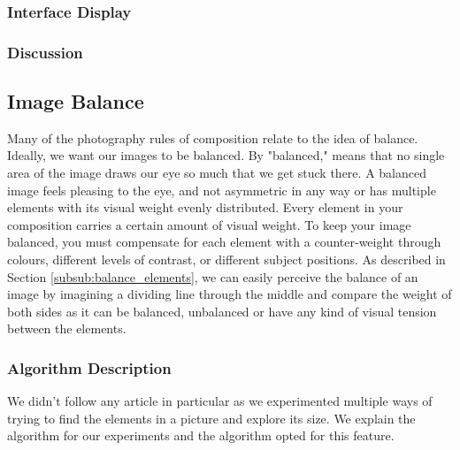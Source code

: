 \subsubsection{Interface Display}


\subsubsection{Discussion}

\subsection{Image Balance}
\label{sub:balance}
Many of the photography rules of composition relate to the idea of balance. Ideally, we want our images to be balanced. By "balanced," means that no single area of the image draws our eye so much that we get stuck there. A balanced image feels pleasing to the eye, and not asymmetric in any way or has multiple elements with its visual weight evenly distributed. Every element in your composition carries a certain amount of visual weight. To keep your image balanced, you must compensate for each element with a counter-weight through colours, different levels of contrast, or different subject positions. As described in Section \ref{subsub:balance_elements}, we can easily perceive the balance of an image by imagining a dividing line through the middle and compare the weight of both sides as it can be balanced, unbalanced or have any kind of visual tension between the elements.

\subsubsection{Algorithm Description}

We didn't follow any article in particular as we experimented multiple ways of trying to find the elements in a picture and explore its size. We explain the algorithm for our experiments and the algorithm opted for this feature.

